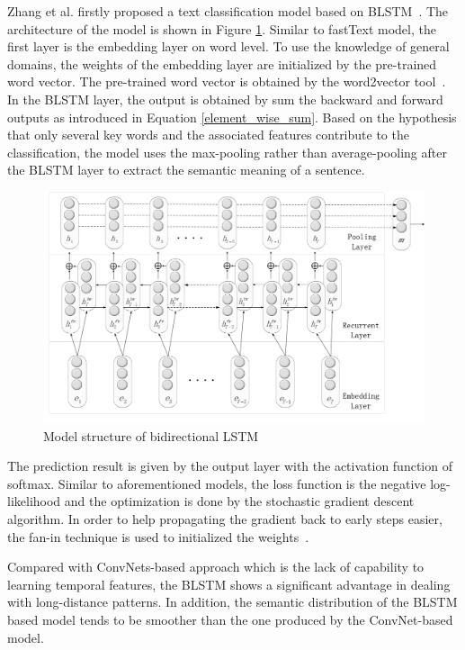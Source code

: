 Zhang et al. firstly proposed a text classification model based on BLSTM~\cite{zhang2015relation}. The architecture of the model is shown in Figure \ref{blstm}. Similar to fastText model, the first layer is the embedding layer on word level. To use the knowledge of general domains, the weights of the embedding layer are initialized by the pre-trained word vector. The pre-trained word vector is obtained by the word2vector tool~\cite{Mikolov2013}. In the BLSTM layer, the output is obtained by sum the backward and forward outputs as introduced in Equation \ref{element_wise_sum}. Based on the hypothesis that only several key words and the associated features contribute to the classification, the model uses the max-pooling rather than average-pooling after the BLSTM layer to extract the semantic meaning of a sentence.
\begin{figure}
\caption{Model structure of bidirectional LSTM}
\label{blstm}
\centering
\includegraphics{blstm.png}
\end{figure}

The prediction result is given by the output layer with the activation function of softmax. Similar to aforementioned models, the loss function is the negative log-likelihood and the optimization is done by the stochastic gradient descent algorithm. In order to help propagating the gradient back to early steps easier, the fan-in technique is used to initialized the weights~\cite{plaut1987learning}. 

Compared with ConvNets-based approach which is the lack of capability to learning temporal features, the BLSTM shows a significant advantage in dealing with long-distance patterns. In addition, the semantic distribution of the BLSTM based model tends to be smoother than the one produced by the ConvNet-based model. 



